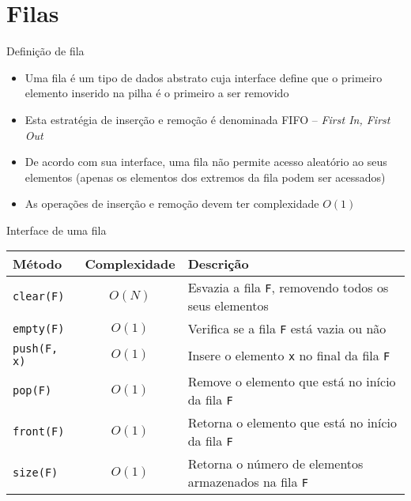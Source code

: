 \section{Filas}

\begin{frame}[fragile]{Definição de fila}

    \begin{itemize}
        \item Uma fila é um tipo de dados abstrato cuja interface define que o primeiro elemento
            inserido na pilha é o primeiro a ser removido

        \item Esta estratégia de inserção e remoção é denominada FIFO -- \textit{First In, First
            Out}

        \item De acordo com sua interface, uma fila não permite acesso aleatório ao seus
            elementos (apenas os elementos dos extremos da fila podem ser acessados)

        \item As operações de inserção e remoção devem ter complexidade $O(1)$

    \end{itemize}

\end{frame}

\begin{frame}[fragile]{Interface de uma fila}

    \begin{table}
        \centering
        \begin{tabularx}{0.95\textwidth}{lcX}
            \toprule
            \textbf{Método} & \textbf{Complexidade} & \textbf{Descrição} \\
            \midrule
            \texttt{clear(F)} & $O(N)$ & Esvazia a fila \texttt{F}, removendo todos os seus elementos \\
            \rowcolor[gray]{0.8}
            \texttt{empty(F)} & $O(1)$ & Verifica se a fila \texttt{F} está vazia ou não \\
            \texttt{push(F, x)} & $O(1)$ & Insere o elemento \texttt{x} no final da fila \texttt{F} \\
            \rowcolor[gray]{0.8}
            \texttt{pop(F)} & $O(1)$ & Remove o elemento que está no início da fila \texttt{F} \\
            \texttt{front(F)} & $O(1)$ & Retorna o elemento que está no início da fila \texttt{F} \\
            \rowcolor[gray]{0.8}
            \texttt{size(F)} & $O(1)$ & Retorna o número de elementos armazenados na fila \texttt{F} \\
            \bottomrule
        \end{tabularx}
    \end{table}
\end{frame}

